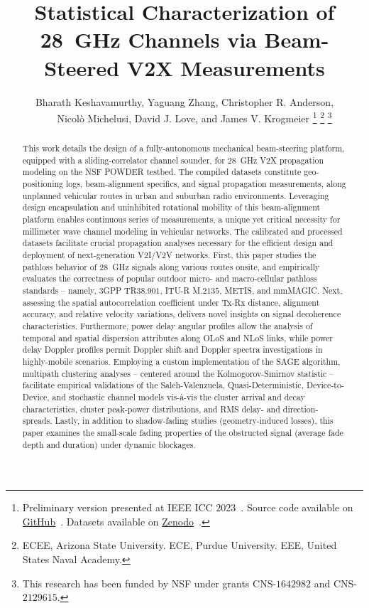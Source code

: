 \documentclass[12pt, draftcls, onecolumn]{IEEEtran}
\title{Statistical Characterization of \SI{28}{\giga\hertz} Channels via Beam-Steered V2X Measurements}
\author{Bharath Keshavamurthy\IEEEauthorrefmark{1}, Yaguang Zhang\IEEEauthorrefmark{2}, Christopher R. Anderson\IEEEauthorrefmark{3},\\\ \ \ \ Nicol\`{o} Michelusi\IEEEauthorrefmark{1}, David J. Love\IEEEauthorrefmark{2}, and James V. Krogmeier\IEEEauthorrefmark{2}
\thanks{Preliminary version presented at IEEE ICC $2023$~\cite{SPAVE_ICC}. Source code available on \href{https://github.com/bharathkeshavamurthy/SPAVE-28G}{GitHub}~\cite{SPAVE_Source_Code}. Datasets available on \href{https://doi.org/10.5281/zenodo.7178597}{Zenodo}~\cite{SPAVE_Dataset}.}
\thanks{\IEEEauthorrefmark{1}ECEE, Arizona State University. \IEEEauthorrefmark{2}ECE, Purdue University. \IEEEauthorrefmark{3}EEE, United States Naval Academy.}
\thanks{This research has been funded by NSF under grants CNS-$1642982$ and CNS-$2129615$.}
\vspace{-9mm}
}
\begin{document}

\maketitle
\thispagestyle{plain}
\pagestyle{plain}
\vspace{-9mm}

\begin{abstract}
This work details the design of a fully-autonomous mechanical beam-steering platform, equipped with a sliding-correlator channel sounder, for \SI{28}{\giga\hertz} V2X propagation modeling on the NSF POWDER testbed. The compiled datasets constitute geo-positioning logs, beam-alignment specifics, and signal propagation measurements, along unplanned vehicular routes in urban and suburban radio environments. Leveraging design encapsulation and uninhibited rotational mobility of this beam-alignment platform enables continuous series of measurements, a unique yet critical necessity for millimeter wave channel modeling in vehicular networks. The calibrated and processed datasets facilitate crucial propagation analyses necessary for the efficient design and deployment of next-generation V$2$I/V$2$V networks. First, this paper studies the pathloss behavior of \SI{28}{\giga\hertz} signals along various routes onsite, and empirically evaluates the correctness of popular outdoor micro- and macro-cellular pathloss standards -- namely, $3$GPP TR$38.901$, ITU-R M$.2135$, METIS, and mmMAGIC. Next, assessing the spatial autocorrelation coefficient under Tx-Rx distance, alignment accuracy, and relative velocity variations, delivers novel insights on signal decoherence characteristics. Furthermore, power delay angular profiles allow the analysis of temporal and spatial dispersion attributes along OLoS and NLoS links, while power delay Doppler profiles permit Doppler shift and Doppler spectra investigations in highly-mobile scenarios. Employing a custom implementation of the SAGE algorithm, multipath clustering analyses -- centered around the Kolmogorov-Smirnov statistic -- facilitate empirical validations of the Saleh-Valenzuela, Quasi-Deterministic, Device-to-Device, and stochastic channel models vis-\`{a}-vis the cluster arrival and decay characteristics, cluster peak-power distributions, and RMS delay- and direction-spreads. Lastly, in addition to shadow-fading studies (geometry-induced losses), this paper examines the small-scale fading properties of the obstructed signal (average fade depth and duration) under dynamic blockages.
\end{abstract}
\vspace{-3mm}
\end{document}
